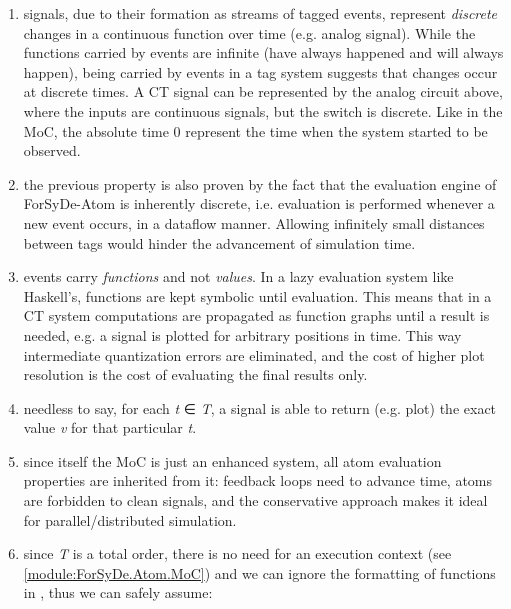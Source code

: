                 \begin{enumerate}
                 \item 
                  signals, due to their formation as streams of tagged
 events, represent \emph{discrete} changes in a continuous function
 over time (e.g. analog signal). While the functions carried by
 events are infinite (have always happened and will always
 happen), being carried by events in a tag system suggests that
 changes occur at discrete times. A CT signal can be represented
 by the analog circuit above, where the inputs are continuous
 signals, but the switch is discrete. Like in the
  MoC, the absolute time 0 represent the time
 when the system started to be observed.\par
                 
                 \item 
                 the previous property is also proven by the fact that the
 evaluation engine of ForSyDe-Atom is inherently discrete,
 i.e. evaluation is performed whenever a new event occurs, in a
 dataflow manner. Allowing infinitely small distances between tags
 would hinder the advancement of simulation time.\par
                 
                 \item 
                 events carry \emph{functions} and not \emph{values}. In a lazy
 evaluation system like Haskell's, functions are kept symbolic
 until evaluation. This means that in a CT system computations are
 propagated as function graphs until a result is needed, e.g. a
 signal is plotted for arbitrary positions in time. This way
 intermediate quantization errors are eliminated, and the cost of
 higher plot resolution is the cost of evaluating the final
 results only.\par
                 
                 \item 
                 needless to say, for each \emph{t} ∈ \emph{T}, a signal is able to
 return (e.g. plot) the exact value \emph{v} for that particular \emph{t}.\par
                 
                 \item 
                 since itself the  MoC is just an enhanced
  system, all atom evaluation properties are
 inherited from it: feedback loops need to advance time, atoms are
 forbidden to clean signals, and the conservative approach makes
 it ideal for parallel/distributed simulation.\par
                 
                 \item 
                 since \emph{T} is a total order, there is no need for an
 execution context (see \cref{module:ForSyDe.Atom.MoC}) and we can
 ignore the formatting of functions in , thus we
 can safely assume:\par
                 
                 \end{enumerate}
